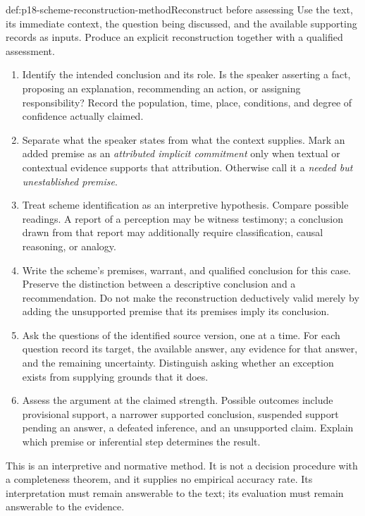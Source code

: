 \begin{hbmethod}{def:p18-scheme-reconstruction-method}{Reconstruct before assessing}
Use the text, its immediate context, the question being discussed, and
the available supporting records as inputs. Produce an explicit
reconstruction together with a qualified assessment.

\begin{enumerate}
\item Identify the intended conclusion and its role. Is the speaker
asserting a fact, proposing an explanation, recommending an action,
or assigning responsibility? Record the population, time, place,
conditions, and degree of confidence actually claimed.
\item Separate what the speaker states from what the context supplies.
Mark an added premise as an \emph{attributed implicit commitment}
only when textual or contextual evidence supports that attribution.
Otherwise call it a \emph{needed but unestablished premise}.
\item Treat scheme identification as an interpretive hypothesis.
Compare possible readings. A report of a perception may be witness
testimony; a conclusion drawn from that report may additionally require
classification, causal reasoning, or analogy.
\item Write the scheme's premises, warrant, and qualified conclusion for
this case. Preserve the distinction between a descriptive conclusion
and a recommendation. Do not make the reconstruction deductively valid
merely by adding the unsupported premise that its premises imply its
conclusion.
\item Ask the questions of the identified source version, one at a time.
For each question record its target, the available answer, any evidence
for that answer, and the remaining uncertainty. Distinguish asking
whether an exception exists from supplying grounds that it does.
\item Assess the argument at the claimed strength. Possible outcomes
include provisional support, a narrower supported conclusion, suspended
support pending an answer, a defeated inference, and an unsupported
claim. Explain which premise or inferential step determines the result.
\end{enumerate}

This is an interpretive and normative method. It is not a decision
procedure with a completeness theorem, and it supplies no empirical
accuracy rate. Its interpretation must remain answerable to the text;
its evaluation must remain answerable to the evidence.
\end{hbmethod}

